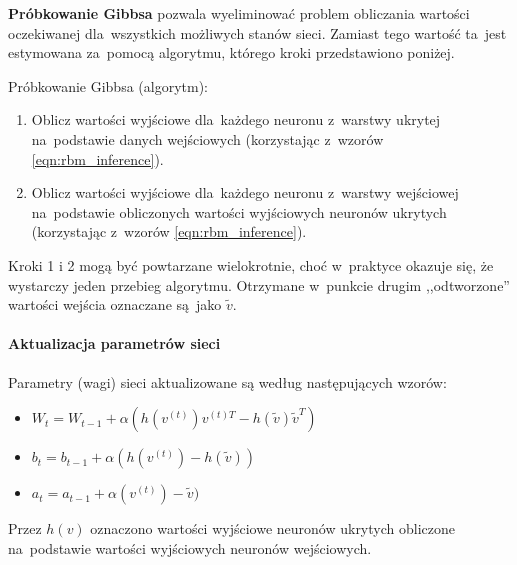 \textbf{Próbkowanie Gibbsa} pozwala wyeliminować problem obliczania wartości oczekiwanej dla~wszystkich
możliwych stanów sieci. Zamiast tego wartość ta~jest estymowana za~pomocą algorytmu, którego kroki
przedstawiono poniżej.

Próbkowanie Gibbsa (algorytm):
\begin{enumerate}
  \item Oblicz wartości wyjściowe dla~każdego neuronu z~warstwy ukrytej na~podstawie danych wejściowych
  (korzystając z~wzorów \ref{eqn:rbm_inference}).
  \item Oblicz wartości wyjściowe dla~każdego neuronu z~warstwy wejściowej na~podstawie obliczonych wartości
  wyjściowych neuronów ukrytych (korzystając z~wzorów \ref{eqn:rbm_inference}).
\end{enumerate}

Kroki 1 i 2 mogą być powtarzane wielokrotnie, choć w~praktyce okazuje się, że wystarczy jeden
przebieg algorytmu. Otrzymane w~punkcie drugim ,,odtworzone'' wartości wejścia oznaczane są~jako $\tilde{v}$.

\paragraph{Aktualizacja parametrów sieci}
Parametry (wagi) sieci aktualizowane są według następujących wzorów:
\begin{itemize}
  \item $W_t=W_{t-1}+\alpha(h(v^{(t)})v^{(t)T}-h(\tilde{v})\tilde{v}^{T})$
  \item $b_t=b_{t-1}+\alpha(h(v^{(t)})-h(\tilde{v}))$
  \item $a_t=a_{t-1}+\alpha(v^{(t)})-\tilde{v})$
\end{itemize}
\vspace{1cm}

Przez $h(v)$ oznaczono wartości wyjściowe neuronów ukrytych obliczone na~podstawie wartości wyjściowych
neuronów wejściowych.
